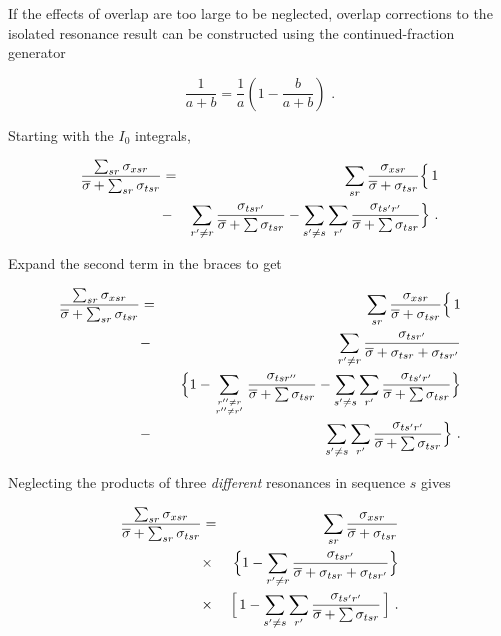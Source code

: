 If the effects of overlap are too large to be neglected, overlap
 corrections to the isolated resonance
result can be constructed using the continued-fraction generator

\begin{equation}
   \frac{1}{a+b}=\frac{1}{a}\left(1-\frac{b}{a+b}\right)\,\,.
\end{equation}

\noindent
Starting with the $I_0$ integrals,

\begin{eqnarray}
   \frac{\sum_{sr}\sigma_{xsr}}
     {\overline{\sigma}+\sum_{sr}\sigma_{tsr}}
   &=&\sum_{sr}
     \frac{\sigma_{xsr}}
      {\overline{\sigma}+\sigma_{tsr}}\Bigl\{\,1 \nonumber\\
   &-&\sum_{r'{\neq}r}\frac{\sigma_{tsr'}}
      {\overline{\sigma}+\sum\sigma_{tsr}}
      -\sum_{s'\neq s}\sum_{r'}\frac{\sigma_{ts'r'}}
         {\overline{\sigma}+\sum\sigma_{tsr}}\Bigr\}\,\,.
\end{eqnarray}

\noindent
Expand the second term in the braces to get

\begin{eqnarray}
   \frac{\sum_{sr}\sigma_{xsr}}
     {\overline{\sigma}+\sum_{sr}\sigma_{tsr}}
   &=&\sum_{sr}
     \frac{\sigma_{xsr}}
      {\overline{\sigma}+\sigma_{tsr}}\Bigl\{\,1 \nonumber\\
   &-&\sum_{r'{\neq}r}\frac{\sigma_{tsr'}}
      {\overline{\sigma}+\sigma_{tsr}+\sigma_{tsr'}} \nonumber\\
   & &\;\;\;\Bigl\{1
      -\sum_{{r''\neq r}\atop{r''\neq r'}}\frac{\sigma_{tsr''}}
         {\overline{\sigma}+\sum\sigma_{tsr}}
      -\sum_{s'\neq s}\sum_{r'}\frac{\sigma_{ts'r'}}
         {\overline{\sigma}+\sum\sigma_{tsr}}\Bigr\}\nonumber\\
   &-&\sum_{s'\neq s}\sum_{r'}\frac{\sigma_{ts'r'}}
         {\overline{\sigma}+\sum\sigma_{tsr}}\Bigr\}\,\,.
\end{eqnarray}

\noindent
Neglecting the products of three {\em different} resonances
in sequence $s$ gives

\begin{eqnarray}
   \frac{\sum_{sr}\sigma_{xsr}}
     {\overline{\sigma}+\sum_{sr}\sigma_{tsr}}
   &=&\sum_{sr}
     \frac{\sigma_{xsr}}
      {\overline{\sigma}+\sigma_{tsr}}  \nonumber\\
   &\times&\Bigl\{1-\sum_{r'{\neq}r}\frac{\sigma_{tsr'}}
      {\overline{\sigma}+\sigma_{tsr}+\sigma_{tsr'}}
                \Bigr\} \nonumber\\
   &\times& \Bigl[\, 1-\sum_{s'\neq s}\sum_{r'}\frac{\sigma_{ts'r'}}
         {\overline{\sigma}+\sum\sigma_{tsr}} \,\Bigr]\,\,.
\end{eqnarray}

